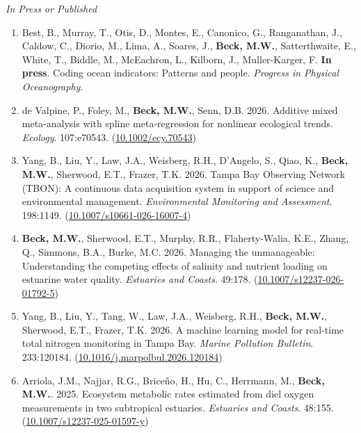 \documentclass[letterpaper,12pt]{article}
\newcommand{\subsectitle}[1]{\vspace{\baselineskip} \centerline{\normalsize{\textit{#1}}}}
\begin{document}
\subsectitle{In Press or Published}

\begin{enumerate}  

\item Best, B., Murray, T., Otis, D., Montes, E., Canonico, G., Ranganathan, J., Caldow, C., Diorio, M., Lima, A., Soares, J., \textbf{Beck, M.W.}, Satterthwaite, E., White, T., Biddle, M., McEachron, L., Kilborn, J., Muller-Karger, F. \textbf{In press}. Coding ocean indicators: Patterns and people. \textit{Progress in Physical Oceanography}.

\item de Valpine, P., Foley, M., \textbf{Beck, M.W.}, Senn, D.B. 2026. Additive mixed meta-analysis with spline meta-regression for nonlinear ecological trends. \textit{Ecology}. 107:e70543. ({\footnotesize\href{https://doi.org/10.1002/ecy.70543}{10.1002/ecy.70543}})

\item Yang, B., Liu, Y., Law, J.A., Weisberg, R.H., D'Angelo, S., Qiao, K., \textbf{Beck, M.W.}, Sherwood, E.T., Frazer, T.K. 2026. Tampa Bay Observing Network (TBON): A continuous data acquisition system in support of science and environmental management. \textit{Environmental Monitoring and Assessment}. 198:1149. ({\footnotesize\href{https://doi.org/10.1007/s10661-026-16007-4}{10.1007/s10661-026-16007-4}})

\item \textbf{Beck, M.W.}, Sherwood, E.T., Murphy, R.R., Flaherty-Walia, K.E., Zhang, Q., Simmons, B.A., Burke, M.C. 2026. Managing the unmanageable: Understanding the competing effects of salinity and nutrient loading on estuarine water quality. \textit{Estuaries and Coasts}. 49:178. ({\footnotesize\href{https://doi.org/10.1007/s12237-026-01792-5}{10.1007/s12237-026-01792-5}})

\item Yang, B., Liu, Y., Tang, W., Law, J.A., Weisberg, R.H., \textbf{Beck, M.W.}, Sherwood, E.T., Frazer, T.K. 2026. A machine learning model for real-time total nitrogen monitoring in Tampa Bay. \textit{Marine Pollution Bulletin}. 233:120184. ({\footnotesize\href{https://doi.org/10.1016/j.marpolbul.2026.120184}{10.1016/j.marpolbul.2026.120184}})
 
\item Arriola, J.M., Najjar, R.G., Brice\~{n}o, H., Hu, C., Herrmann, M., \textbf{Beck, M.W.}. 2025. Ecosystem metabolic rates estimated from diel oxygen measurements in two subtropical estuaries. \textit{Estuaries and Coasts}. 48:155. ({\footnotesize\href{https://doi.org/10.1007/s12237-025-01597-y}{10.1007/s12237-025-01597-y}})


\end{enumerate}
\end{document}
